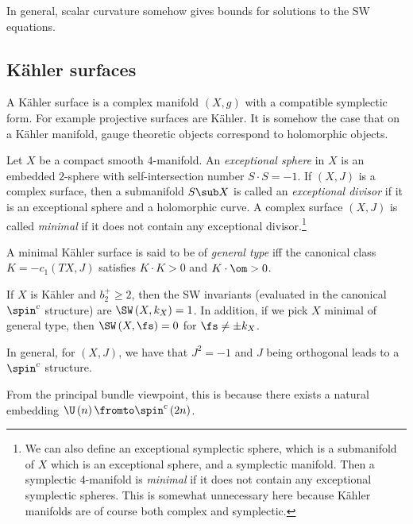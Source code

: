 \documentclass{amsart}
\begin{document}
\begin{rmk}
In general, scalar curvature somehow gives bounds for solutions to the SW equations.
\end{rmk}

\subsection{K\"ahler surfaces}

A K\"ahler surface is a complex manifold $\left( X , g \right)$ with a compatible symplectic form. 
For example projective surfaces are K\"ahler.
It is somehow the case that on a K\"ahler manifold, 
gauge theoretic objects correspond to holomorphic objects.

Let $X$ be a compact smooth $4$-manifold.
An \emph{exceptional sphere} in $X$
is an embedded $2$-sphere with self-intersection number
$S\cdot S = -1$. 
If $\left( X , J \right)$ is a complex surface, then a submanifold
$S\sub X$ is called an \emph{exceptional divisor} if it is an exceptional sphere
and a holomorphic curve. 
A complex surface $\left( X , J \right)$ is called \emph{minimal} if it
does not contain any exceptional divisor.\footnote{
We can also define an exceptional symplectic sphere, which is a submanifold of $X$ which
is an exceptional sphere, and a symplectic manifold. 
Then a symplectic $4$-manifold is \emph{minimal} 
if it does not contain any exceptional symplectic spheres.
This is somewhat unnecessary here because K\"ahler manifolds
are of course both complex and symplectic.}

\begin{defn}
A minimal K\"ahler surface is said to be of \emph{general type}
iff the canonical class $K= - c_1\left( TX , J \right)$
satisfies $K\cdot K > 0$ and $K\cdot \om > 0$.
\end{defn}

\begin{thm}
If $X$ is K\"ahler and $b_2^+ \geq 2$,
then the SW invariants (evaluated in the canonical $\spin^c$ structure) are
$\SW\left( X, k_X \right)= 1$.
In addition, if we pick $X$ minimal of general type, then
$\SW\left( X , \fs \right)= 0$ for $\fs\neq \pm k_X$.
\end{thm}

In general, for $\left( X , J \right)$, we have that $J^2 = -1$ and $J$ being orthogonal
leads to a $\spin^c$ structure.

\begin{rmk}
From the principal bundle viewpoint, this is because there
exists a natural embedding $\U\left( n \right)\fromto \spin^c\left( 2n \right)$.
\end{rmk}
\end{document}
